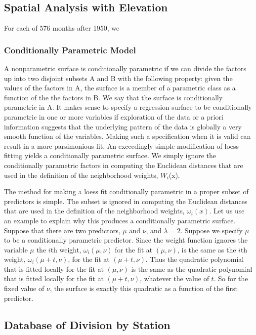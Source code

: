 \subsection{Spatial Analysis with Elevation}

For each of 576 months after 1950, we 

\subsubsection{Conditionally Parametric Model}

A nonparametric surface is conditionally
parametric if we can divide the factors up into two disjoint subsets
A and B with the following property: given the values of the factors in A,
the surface is a member of a parametric class as a function of the the factors
in B. We say that the surface is conditionally parametric in A.
It makes sense to specify a regression surface to be conditionally parametric
in one or more variables if exploration of the data or a priori information
suggests that the underlying pattern of the data is globally a very smooth
function of the variables. Making such a specification when it is valid can
result in a more parsimonious fit.
An exceedingly simple modification of loess fitting yields a conditionally
parametric surface. We simply ignore the conditionally parametric factors
in computing the Euclidean distances that are used in the definition of the
neighborhood weights, $W_i$(x).

The method for making a loess fit conditionally parametric in a proper subset of
predictors is simple. The subset is ignored in computing the Euclidean distances 
that are used in the definition of the neighborhood weights, $\omega_i(x)$. Let 
us use an example to explain why this produces a conditionally parametric surface. 
Suppose that there are two predictors, $\mu$ and $\nu$, and $\lambda=2$. Suppose 
we specify $\mu$ to be a conditionally parametric predictor. Since the weight 
function ignores the variable $\mu$ the $i$th weight, $\omega_i(\mu, \nu)$ for 
the fit at $(\mu, \nu)$, is the same as the $i$th weight, $\omega_i(\mu+t, \nu)$, 
for the fit at $(\mu+t, \nu)$. Thus the quadratic polynomial that is fitted locally 
for the fit at $(\mu, \nu)$ is the same as the quadratic polynomial that is fitted 
locally for the fit at $(\mu+t, \nu)$, whatever the value of $t$. So for the fixed 
value of $\nu$, the surface is exactly this quadratic as a function of the first 
predictor.

\subsection{Database of Division by Station}
\label{sec:a1950.divibyStation}

